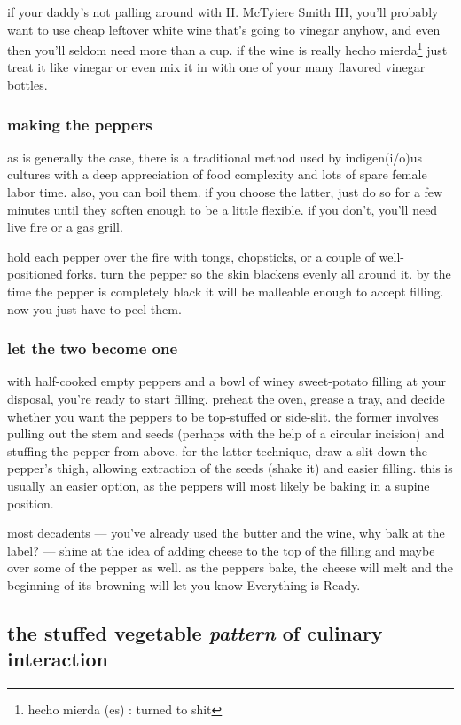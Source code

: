 if your daddy's not palling around with H. McTyiere Smith III, you'll probably 
want to use cheap leftover white wine that's going to vinegar anyhow, and even 
then you'll seldom need more than a cup. if the wine is really hecho 
mierda\footnote{hecho mierda (es) : turned to shit} just treat it like vinegar 
or even mix it in with one of your many flavored vinegar bottles.

\subsubsection{making the peppers}

as is generally the case, there is a traditional method used by indigen(i/o)us 
cultures with a deep appreciation of food complexity and lots of spare female 
labor time. also, you can boil them. if you choose the latter, just do so for 
a few minutes until they soften enough to be a little flexible. if you don't, 
you'll need live fire or a gas grill.

hold each pepper over the fire with tongs, chopsticks, or a couple of 
well-positioned forks. turn the pepper so the skin blackens evenly all around 
it. by the time the pepper is completely black it will be malleable enough to 
accept filling. now you just have to peel them.

\subsubsection{let the two become one}

with half-cooked empty peppers and a bowl of winey sweet-potato filling at 
your disposal, you're ready to start filling. preheat the oven, grease a tray, 
and decide whether you want the peppers to be top-stuffed or side-slit. the 
former involves pulling out the stem and seeds (perhaps with the help of a 
circular incision) and stuffing the pepper from above. for the latter 
technique, draw a slit down the pepper's thigh, allowing extraction of the 
seeds (shake it) and easier filling. this is usually an easier option, as the 
peppers will most likely be baking in a supine position.

most decadents --- you've already used the butter and the wine, why balk at 
the label? --- shine at the idea of adding cheese to the top of the filling 
and maybe over some of the pepper as well. as the peppers bake, the cheese 
will melt and the beginning of its browning will let you know Everything is 
Ready.

\subsection{the stuffed vegetable \textit{pattern} of culinary interaction}

